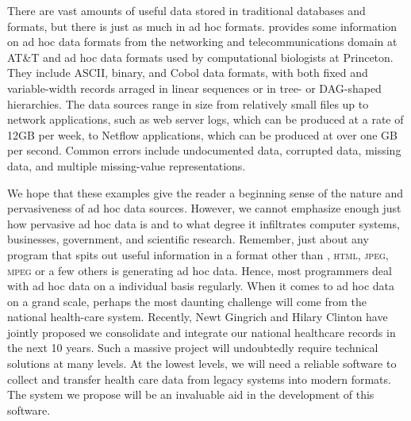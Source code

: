 \documentclass{entcs}
\begin{document}
There are vast amounts of useful data stored in traditional databases
and \xml{} formats, but there is just as much in ad hoc formats.
 provides some information on ad hoc data
formats from the networking and telecommunications domain at AT\&T and
ad hoc data formats used by computational biologists at Princeton.
They include ASCII, binary, and Cobol data formats, with both fixed
and variable-width records arraged in linear sequences or in tree- or
DAG-shaped hierarchies.  The data sources range in size from
relatively small files up to network applications, such as web server
logs, which can be produced at a rate of 12GB per week, to Netflow
applications, which can be produced at over one GB per second.  Common
errors include undocumented data, corrupted data, missing data, and
multiple missing-value representations.

We hope that these examples give the reader a beginning sense of the
nature and pervasiveness of ad hoc data sources.  However, we cannot
emphasize enough just how pervasive ad hoc data is and to what degree
it infiltrates computer systems, businesses, government, and
scientific research.  Remember, just about any program that spits out
useful information in a format other than \xml{}, \textsc{html},
\textsc{jpeg}, \textsc{mpeg} or a few others is generating ad hoc
data.  Hence, most programmers deal with ad hoc data on a individual
basis regularly.  When it comes to ad hoc data on a grand scale,
perhaps the most daunting challenge will come from the national
health-care system.  Recently, Newt Gingrich and Hilary Clinton have
jointly proposed we consolidate and integrate our national healthcare
records in the next 10 years.  Such a massive project will undoubtedly
require technical solutions at many levels.  At the lowest levels, we
will need a reliable software to collect and transfer health care data
from legacy systems into modern formats.  The \datatype{} system we
propose will be an invaluable aid in the development of this software.
\end{document}

